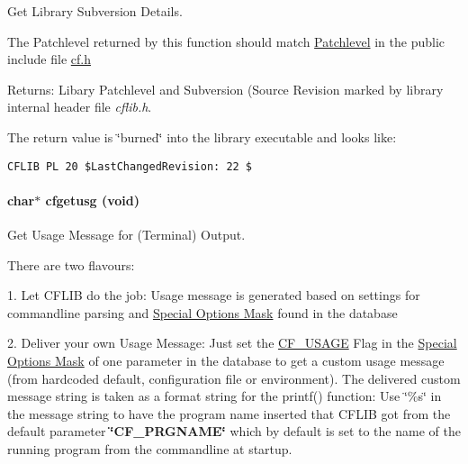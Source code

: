 Get Library Subversion Details. 

The Patchlevel returned by this function should match \hyperlink{group__cflib__core_g0beb5d41f2b506f1c969c56731bb9490}{Patchlevel} in the public include file \hyperlink{cf_8h}{cf.h}

\begin{Desc}
\item[Returns:]Libary Patchlevel and Subversion (Source Revision marked by library internal header file {\em cflib.h\/}.\end{Desc}
The return value is \char`\"{}burned\char`\"{} into the library executable and looks like: 

\footnotesize\begin{verbatim}CFLIB PL 20 $LastChangedRevision: 22 $ \end{verbatim}
\normalsize
 \hypertarget{group__retrieval_ge272c1881db940e56c8cc364df730271}{
\paragraph[{cfgetusg}]{\setlength{\rightskip}{0pt plus 5cm}char$\ast$ cfgetusg (void)}\hfill}
\label{group__retrieval_ge272c1881db940e56c8cc364df730271}


Get Usage Message for (Terminal) Output. 

There are two flavours:

1. Let CFLIB do the job: Usage message is generated based on settings for commandline parsing and \hyperlink{group__special__options__mask}{Special Options Mask} found in the database

2. Deliver your own Usage Message: Just set the \hyperlink{group__special__options__mask_gc30981201d7455071cef38a0133b9228}{CF\_\-USAGE} Flag in the \hyperlink{group__special__options__mask}{Special Options Mask} of one parameter in the database to get a custom usage message (from hardcoded default, configuration file or environment). The delivered custom message string is taken as a format string for the printf() function: Use \char`\"{}\%s\char`\"{} in the message string to have the program name inserted that CFLIB got from the default parameter {\bf \char`\"{}CF\_\-PRGNAME\char`\"{}} which by default is set to the name of the running program from the commandline at startup.

